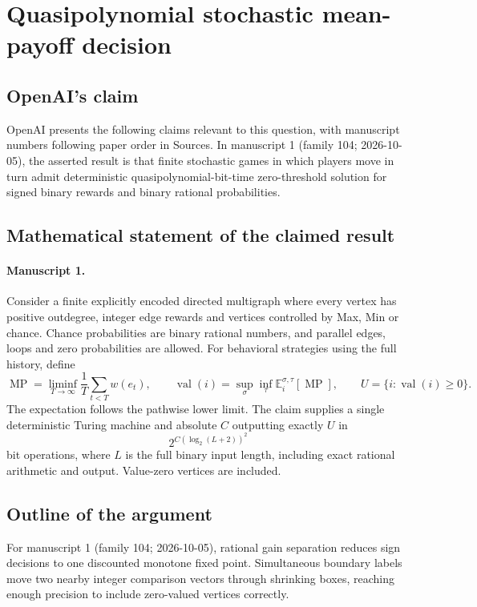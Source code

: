 \documentclass[11pt]{article}
\begin{document}
\section*{Quasipolynomial stochastic mean-payoff decision}

\subsection{OpenAI's claim}
OpenAI presents the following claims relevant to this question, with manuscript numbers following paper order in Sources. In manuscript 1 (family 104; 2026-10-05), the asserted result is that finite stochastic games in which players move in turn admit deterministic quasipolynomial-bit-time zero-threshold solution for signed binary rewards and binary rational probabilities.

\subsection{Mathematical statement of the claimed result}
\paragraph{Manuscript 1.}
Consider a finite explicitly encoded directed multigraph where every vertex has positive outdegree, integer edge rewards and vertices controlled by Max, Min or chance. Chance probabilities are binary rational numbers, and parallel edges, loops and zero probabilities are allowed. For behavioral strategies using the full history, define
\[
 \operatorname{MP}=\liminf_{T\to\infty}\frac1T\sum_{t<T}w(e_t),\qquad
 \operatorname{val}(i)=\sup_{\sigma}\inf_{\tau}\mathbb E_i^{\sigma,\tau}[\operatorname{MP}],
 \qquad U=\{i:\operatorname{val}(i)\ge0\}.
\]
The expectation follows the pathwise lower limit. The claim supplies a single deterministic Turing machine and absolute $C$ outputting exactly $U$ in
\[
 2^{C(\log_2(L+2))^2}
\]
bit operations, where $L$ is the full binary input length, including exact rational arithmetic and output. Value-zero vertices are included.

\subsection{Outline of the argument}
For manuscript 1 (family 104; 2026-10-05), rational gain separation reduces sign decisions to one discounted monotone fixed point. Simultaneous boundary labels move two nearby integer comparison vectors through shrinking boxes, reaching enough precision to include zero-valued vertices correctly.
\end{document}
